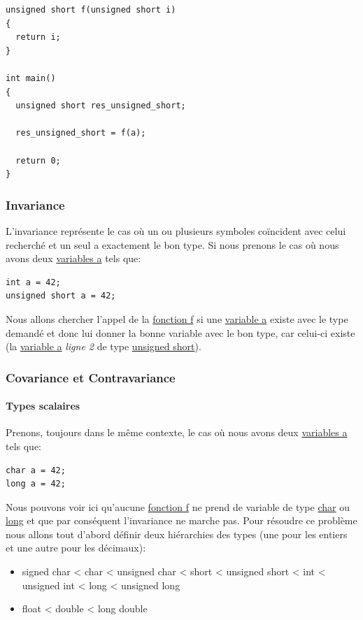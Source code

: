 \documentclass[12pt,a4paper]{article}
\begin{document}
\begin{NoHyper}
\begin{lstlisting}
unsigned short f(unsigned short i)
{
  return i;
}

int main()
{
  unsigned short res_unsigned_short;
  
  res_unsigned_short = f(a);
  
  return 0;
}
\end{lstlisting}

\subsubsection{Invariance}
L’invariance représente le cas où un ou plusieurs symboles coïncident avec celui recherché et un seul a exactement le bon type.\newline
Si nous prenons le cas où nous avons deux \underline{variables a} tels que:
\begin{lstlisting}
int a = 42;
unsigned short a = 42;
\end{lstlisting}
Nous allons chercher l'appel de la \underline{fonction f} si une \underline{variable a} existe avec le type demandé et donc lui donner la bonne variable avec le bon type, car celui-ci existe (la \underline{variable a} \textit{ligne 2} de type \underline{unsigned short}).

\subsubsection{Covariance et Contravariance}
\paragraph{Types scalaires\\}
Prenons, toujours dans le même contexte, le cas où nous avons deux \underline{variables a} tels que:
\begin{lstlisting}
char a = 42;
long a = 42;
\end{lstlisting}
Nous pouvons voir ici qu'aucune \underline{fonction f} ne prend de variable de type \underline{char} ou \underline{long} et que par conséquent l'invariance ne marche pas.\newline
Pour résoudre ce problème nous allons tout d'abord définir deux hiérarchies des types (une pour les entiers et une autre pour les décimaux):
\begin{itemize}
  \item signed char < char < unsigned char < short < unsigned short < int < unsigned int < long < unsigned long
  \item float < double < long double \\
\end{itemize}


\end{NoHyper}
\end{document}
